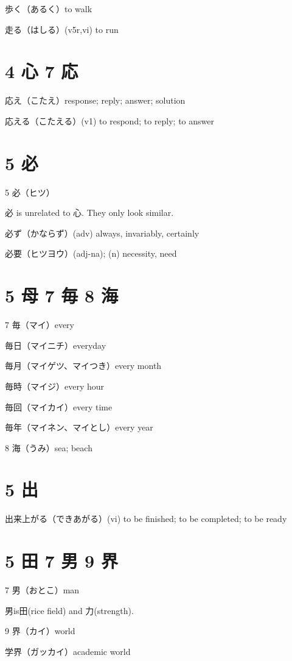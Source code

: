 歩く（あるく）to walk

走る（はしる）(v5r,vi) to run

\section{4 心 7 応}

応え（こたえ）response; reply; answer; solution

応える（こたえる）(v1) to respond; to reply; to answer

\section{5 必}

5 必（ヒツ）

必 is unrelated to 心. They only look similar.

必ず（かならず）(adv) always, invariably, certainly

必要（ヒツヨウ）(adj-na); (n) necessity, need

\section{5 母 7 毎 8 海}

7 毎（マイ）every

毎日（マイニチ）everyday

毎月（マイゲツ、マイつき）every month

毎時（マイジ）every hour

毎回（マイカイ）every time

毎年（マイネン、マイとし）every year

8 海（うみ）sea; beach

\section{5 出}

出来上がる（できあがる）(vi) to be finished; to be completed; to be ready

\section{5 田 7 男 9 界}

7 男（おとこ）man

男is田(rice field) and 力(strength).

9 界（カイ）world

学界（ガッカイ）academic world


